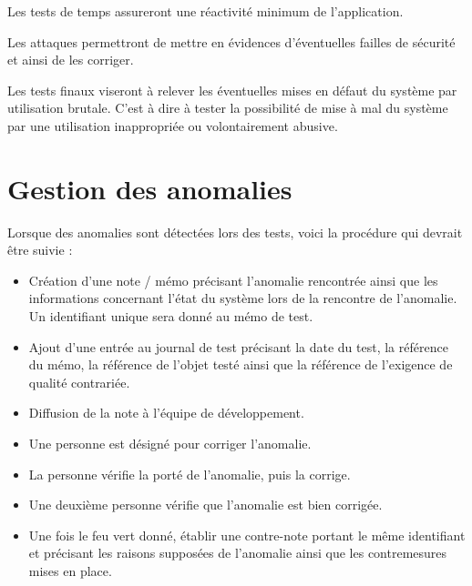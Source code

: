 \documentclass{"../../res/univ-projet"}
\begin{document}
  Les tests de temps assureront une réactivité minimum de l'application.
  
  Les attaques permettront de mettre en évidences d'éventuelles failles de sécurité et ainsi de les corriger.
  
  Les tests finaux viseront à relever les éventuelles mises en défaut du système par utilisation brutale. C'est à dire à tester la possibilité de mise à mal du système par une utilisation inappropriée ou volontairement abusive.
  
  \section{Gestion des anomalies}
  Lorsque des anomalies sont détectées lors des tests, voici la procédure qui devrait être suivie :
  \begin{itemize}
   \item Création d'une note / mémo précisant l'anomalie rencontrée ainsi que les informations concernant l'état du système lors de la rencontre de l'anomalie. Un 
   identifiant unique sera donné au mémo de test.
   \item Ajout d'une entrée au journal de test précisant la date du test, la référence du mémo, la référence de l'objet testé ainsi que la référence de l'exigence de 
   qualité contrariée.
   \item Diffusion de la note à l'équipe de développement.
   \item Une personne est désigné pour corriger l'anomalie.
   \item La personne vérifie la porté de l'anomalie, puis la corrige.
   \item Une deuxième personne vérifie que l'anomalie est bien corrigée.
   \item Une fois le feu vert donné, établir une contre-note portant le même identifiant et précisant les raisons supposées 
   de l'anomalie ainsi que les contremesures mises en place.
  \end{itemize}
\newpage
\end{document}
